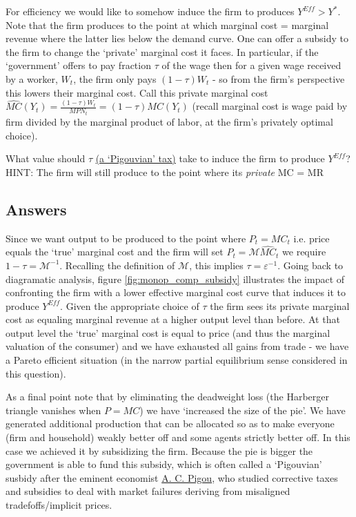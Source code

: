 \documentclass[authoryear,11pt]{elsarticle}
\begin{document}
For efficiency we would like to somehow induce the firm to produces $Y^{Eff}>Y^{\ast}$. Note that the firm produces to the point at which marginal cost = marginal revenue where the latter lies below the demand curve. One can offer a subsidy to the firm to change the `private' marginal cost it faces. In particular, if the `government' offers to pay fraction $\tau$ of the wage then for a given wage received by a worker, $W_{t}$, the firm only pays $(1-\tau)W_{t}$ - so from the firm's perspective this lowers their marginal cost. Call this private marginal cost $\widehat{MC}(Y_{t}) = \frac{(1-\tau)W_{t}}{MPN_{t}} = (1-\tau)MC(Y_{t})$ (recall marginal cost is wage paid by firm divided by the marginal product of labor, at the firm's privately optimal choice).

What value should $\tau$ \href{https://en.wikipedia.org/wiki/Pigovian_tax}{(a `Pigouvian' tax)} take to induce the firm to produce $Y^{Eff}$? HINT: The firm will still produce to the point where its \emph{private} MC = MR

\subsection*{Answers}
Since we want output to be produced to the point where $P_{t} = MC_{t}$ i.e. price equals the `true' marginal cost and the firm will set $P_{t} = \mathcal{M}\widehat{MC}_{t}$ we require $1-\tau = \mathcal{M}^{-1}$. Recalling the definition of $\mathcal{M}$, this implies $\tau = \varepsilon^{-1}$. Going back to diagramatic analysis, figure \ref{fig:monop_comp_subsidy} illustrates the impact of confronting the firm with a lower effective marginal cost curve that induces it to produce $Y^{Eff}$. Given the appropriate choice of $\tau$ the firm sees its private marginal cost as equaling marginal revenue at a higher output level than before. At that output level the `true' marginal cost is equal to price (and thus the marginal valuation of the consumer) and we have exhausted all gains from trade - we have a Pareto efficient situation (in the narrow partial equilibrium sense considered in this question).

As a final point note that by eliminating the deadweight loss (the Harberger triangle vanishes when $P=MC$) we have `increased the size of the pie'. We have generated additional production that can be allocated so as to make everyone (firm and household) weakly better off and some agents strictly better off. In this case we achieved it by subsidizing the firm. Because the pie is bigger the government is able to fund this subsidy, which is often called a `Pigouvian' susbidy after the eminent economist \href{https://en.wikipedia.org/wiki/Arthur_Cecil_Pigou}{A. C. Pigou}, who studied corrective taxes and subsidies to deal with market failures deriving from misaligned tradefoffs/implicit prices.
\end{document}
